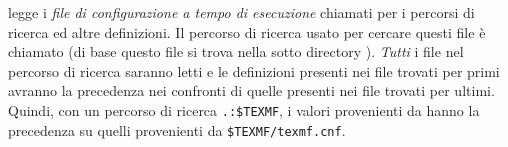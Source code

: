 \documentclass{article}
\begin{document}
\begingroup{}
\KPS{} legge i \emph{file di configurazione a tempo di esecuzione}
chiamati  per i percorsi di ricerca ed altre definizioni.
Il percorso di ricerca usato per cercare questi file è chiamato
 (di base questo file si trova nella sotto directory
). \emph{Tutti} i file  nel percorso di
ricerca saranno letti e le definizioni presenti nei file trovati per primi
avranno la precedenza nei confronti di quelle presenti nei file trovati
per ultimi. Quindi, con un percorso di ricerca \verb|.:$TEXMF|, i valori
provenienti da  hanno la precedenza su quelli
provenienti da \verb|$TEXMF/texmf.cnf|.
\endgroup
\end{document}
